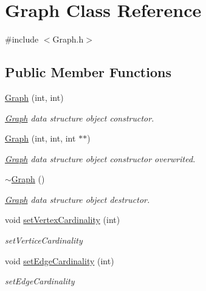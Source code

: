 \hypertarget{classGraph}{}\section{Graph Class Reference}
\label{classGraph}


{\ttfamily \#include $<$Graph.\+h$>$}

\subsection*{Public Member Functions}
\begin{DoxyCompactItemize}
\item 
\hyperlink{classGraph_aad32f8d35016150b565c891e79e70f15}{Graph} (int, int)
\begin{DoxyCompactList}\small\item\em \hyperlink{classGraph}{Graph} data structure object constructor. \end{DoxyCompactList}\item 
\hyperlink{classGraph_a444757b89f987acf5e2088d2e950f787}{Graph} (int, int, int $\ast$$\ast$)
\begin{DoxyCompactList}\small\item\em \hyperlink{classGraph}{Graph} data structure object constructor overwrited. \end{DoxyCompactList}\item 
\mbox{\label{classGraph_a902c5b3eacb66d60752525ab23297a95}} 
\hyperlink{classGraph_a902c5b3eacb66d60752525ab23297a95}{$\sim$\+Graph} ()
\begin{DoxyCompactList}\small\item\em \hyperlink{classGraph}{Graph} data structure object destructor. \end{DoxyCompactList}\item 
void \hyperlink{classGraph_a6d74237b1877d78469273c256bc9392f}{set\+Vertex\+Cardinality} (int)
\begin{DoxyCompactList}\small\item\em setV\textquotesingle{}ertice\+Cardinality \end{DoxyCompactList}\item 
void \hyperlink{classGraph_af7d5f5330b09c20ad08fc181fb7f5655}{set\+Edge\+Cardinality} (int)
\begin{DoxyCompactList}\small\item\em set\+Edge\+Cardinality \end{DoxyCompactList}\item 
$$
\end{DoxyCompactItemize}
